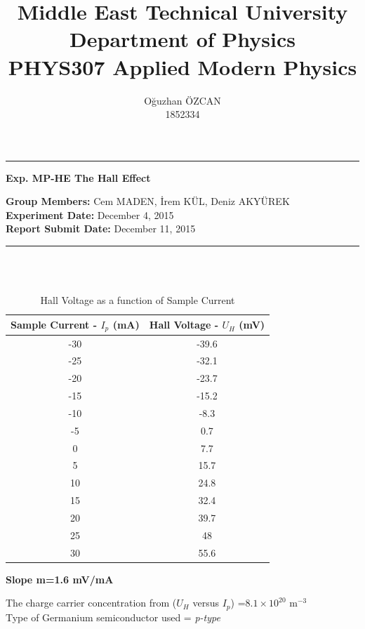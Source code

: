 \documentclass[a4paper,12pt]{article}
\title{Middle East Technical University\\Department of Physics\\\textbf{PHYS307 Applied Modern Physics}}
\author{Oğuzhan ÖZCAN\\1852334}
\date{}
\providecommand{\groupmember}[1]{\textbf{Group Members:} }
\providecommand{\expdate}[1]{\textbf{Experiment Date:} }
\providecommand{\repdate}[1]{\textbf{Report Submit Date:} }
\providecommand{\expname}[1]{\textbf{Exp. MP-HE The Hall Effect} }
\begin{document}
\maketitle

\thispagestyle{fancy}

\noindent\rule{18.4cm}{0.8pt}
\begin{center}
	\expname{arg1}{}
\end{center}
\groupmember{arg1}{Cem MADEN, İrem KÜL, Deniz AKYÜREK}\\
\expdate{November 6, 2015}{December 4, 2015}\\
\repdate{arg1}{December 11, 2015}\\
\noindent\rule{18.4cm}{0.8pt}\\\\
\begin{table}[h!]
\begin{center}
	\begin{tabular}{|c|c|}
	\hline Sample Current - $I_{p}$ (mA) & Hall Voltage - $U_{H}$ (mV) \\ 
	\hline -30 & -39.6 \\ 
	\hline -25 & -32.1 \\ 
	\hline -20 & -23.7 \\ 
	\hline -15 & -15.2 \\ 
	\hline -10 & -8.3 \\ 
	\hline -5 & 0.7 \\ 
	\hline 0 & 7.7 \\ 
	\hline 5 & 15.7 \\ 
	\hline 10 & 24.8 \\ 
	\hline 15 & 32.4 \\ 
	\hline 20 & 39.7 \\ 
	\hline 25 & 48 \\ 
	\hline 30 & 55.6 \\ 
	\hline 
\end{tabular}
\caption{Hall Voltage as a function of Sample Current}
\end{center} 
\end{table}
\begin{center}
\textbf{Slope m=1.6 mV/mA}
\end{center}
\textbullet 	The charge carrier concentration from ($U_{H}$ versus $I_{p}$) =$8.1 \times 10^{20}$ m$^{-3}$\\
\textbullet 	Type of Germanium semiconductor used = \textit{p-type}
\end{document}
